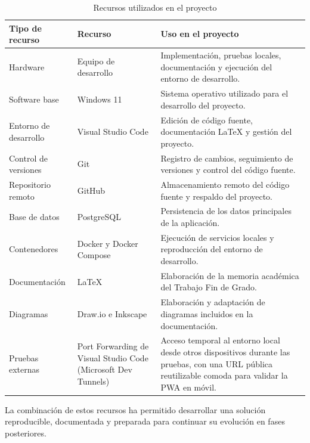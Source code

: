 \begin{table}[htbp]
    \centering
    \small
    \caption{Recursos utilizados en el proyecto}
    \label{tab:project-resources}
    \begin{tabularx}{\textwidth}{|L{3.2cm}|L{3.5cm}|Y|}
        \hline
        \textbf{Tipo de recurso} & \textbf{Recurso} & \textbf{Uso en el proyecto} \\
        \hline
        Hardware & Equipo de desarrollo & Implementación, pruebas locales, documentación y ejecución del entorno de desarrollo. \\
        \hline
        Software base & Windows 11 & Sistema operativo utilizado para el desarrollo del proyecto. \\
        \hline
        Entorno de desarrollo & Visual Studio Code & Edición de código fuente, documentación LaTeX y gestión del proyecto. \\
        \hline
        Control de versiones & Git & Registro de cambios, seguimiento de versiones y control del código fuente. \\
        \hline
        Repositorio remoto & GitHub & Almacenamiento remoto del código fuente y respaldo del proyecto. \\
        \hline
        Base de datos & PostgreSQL & Persistencia de los datos principales de la aplicación. \\
        \hline
        Contenedores & Docker y Docker Compose & Ejecución de servicios locales y reproducción del entorno de desarrollo. \\
        \hline
        Documentación & LaTeX & Elaboración de la memoria académica del Trabajo Fin de Grado. \\
        \hline
        Diagramas & Draw.io e Inkscape & Elaboración y adaptación de diagramas incluidos en la documentación. \\
        \hline
        Pruebas externas & Port Forwarding de Visual Studio Code (Microsoft Dev Tunnels) & Acceso temporal al entorno local desde otros dispositivos durante las pruebas, con una URL pública reutilizable comoda para validar la PWA en móvil. \\
        \hline
    \end{tabularx}
\end{table}

La combinación de estos recursos ha permitido desarrollar una solución reproducible, documentada y preparada para continuar su evolución en fases posteriores.
